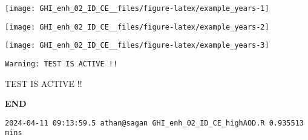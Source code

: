 \documentclass[
  10pt,
  a4paper,oneside]{article}
\begin{document}
\begin{center}\texttt{[image: GHI\_enh\_02\_ID\_CE\_\_files/figure-latex/example\_years-1]} \end{center}

\begin{center}\texttt{[image: GHI\_enh\_02\_ID\_CE\_\_files/figure-latex/example\_years-2]} \end{center}

\begin{center}\texttt{[image: GHI\_enh\_02\_ID\_CE\_\_files/figure-latex/example\_years-3]} \end{center}

\begin{verbatim}
Warning: TEST IS ACTIVE !!
\end{verbatim}

TEST IS ACTIVE !!

\textbf{END}

\begin{verbatim}
2024-04-11 09:13:59.5 athan@sagan GHI_enh_02_ID_CE_highAOD.R 0.935513 mins
\end{verbatim}
\end{document}
